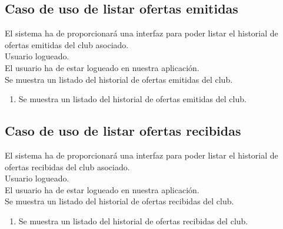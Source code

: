 \subsection*{Caso de uso de listar ofertas emitidas}
 El sistema ha de proporcionará una interfaz para poder
listar el historial de ofertas emitidas del club asociado.\\
 Usuario logueado. \\
 El usuario ha de estar logueado en nuestra aplicación.\\
 Se muestra un listado del historial de ofertas
emitidas del club.\\
\begin{enumerate}
\item Se muestra un listado del historial de ofertas emitidas del club.
\end{enumerate}

\subsection*{Caso de uso de listar ofertas recibidas}
 El sistema ha de proporcionará una interfaz para poder
listar el historial de ofertas recibidas del club asociado.\\
 Usuario logueado. \\
 El usuario ha de estar logueado en nuestra aplicación.\\
 Se muestra un listado del historial de ofertas
recibidas del club.\\  
\begin{enumerate}
\item Se muestra un listado del historial de ofertas recibidas del club.
\end{enumerate}


